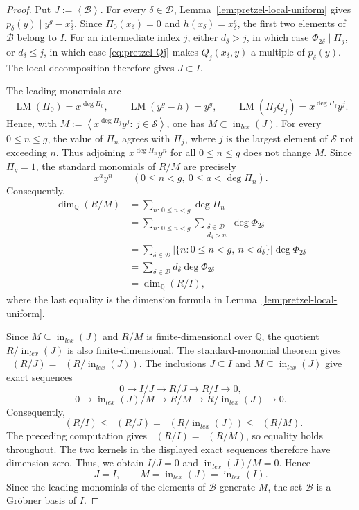\documentclass{article}
\theoremstyle{definition}
\theoremstyle{plain}
\def\dim{\mathop{\mathrm{dim}}\nolimits}
\newcommand{\Q}{{\mathbb{Q}}}
\newcommand{\lex}{lex}
\newcommand{\ideal}[1]{\left\langle #1 \right\rangle}
\DeclareMathOperator{\dimQ}{dim_{\Q}}
\DeclareMathOperator{\inop}{in}
\newcommand{\LM}{\operatorname{LM}}
\begin{document}
\begin{proof}
Put \(J:=\ideal{\mathcal B}\).  For every
\(\delta\in\mathcal D\),
Lemma~\ref{lem:pretzel-local-uniform} gives
\(p_\delta(y)\mid y^g-x_\delta^e\).
Since \(\Pi_0(x_\delta)=0\) and \(h(x_\delta)=x_\delta^e\), the first two
elements of \(\mathcal B\) belong to \(I\).  For an intermediate index
\(j\), either \(d_\delta>j\), in which case
\(\Phi_{2\delta}\mid\Pi_j\), or \(d_\delta\le j\), in which case
\eqref{eq:pretzel-Qj} makes \(Q_j(x_\delta,y)\) a multiple of
\(p_\delta(y)\).  The local decomposition therefore gives
\(J\subset I\).

The leading monomials are
\[
\LM(\Pi_0)=x^{\deg\Pi_0},
\qquad
\LM(y^g-h)=y^g,
\qquad
\LM(\Pi_j Q_j)=x^{\deg\Pi_j}y^j.
\]
Hence, with \(M:=\ideal{x^{\deg\Pi_j}y^j:\,j\in\mathcal S}\), one has
\(M\subset\inop_{\lex}(J)\).  For every
\(0\le n\le g\), the value of \(\Pi_n\) agrees with \(\Pi_j\), where
\(j\) is the largest element of \(\mathcal S\) not exceeding \(n\).
Thus adjoining \(x^{\deg\Pi_n}y^n\) for all \(0\le n\le g\) does not
change \(M\).  Since \(\Pi_g=1\), the standard monomials of \(R/M\) are
precisely
\[
x^a y^n
\qquad
(0\le n<g,\ 0\le a<\deg\Pi_n).
\]
Consequently,
\[
\begin{aligned}
\dim_{\mathbb Q}(R/M)
&=\sum_{n:\,0\le n<g}\deg\Pi_n \\
&=\sum_{n:\,0\le n<g}
\sum_{\substack{\delta\in\mathcal D\\ d_\delta>n}}
\deg\Phi_{2\delta} \\
&=\sum_{\delta\in\mathcal D}
\bigl|\{n:0\le n<g,\ n<d_\delta\}\bigr|
\deg\Phi_{2\delta} \\
&=\sum_{\delta\in\mathcal D}
d_\delta\deg\Phi_{2\delta} \\
&=\dim_{\mathbb Q}(R/I),
\end{aligned}
\]
where the last equality is the dimension formula in
Lemma~\ref{lem:pretzel-local-uniform}.


Since \(M\subseteq\inop_{\lex}(J)\) and
\(R/M\) is finite-dimensional over \(\mathbb Q\),
the quotient \(R/\inop_{\lex}(J)\) is also
finite-dimensional.  The standard-monomial theorem gives
\(\dimQ(R/J)=\dimQ(R/\inop_{\lex}(J))\).
The inclusions \(J\subseteq I\) and
\(M\subseteq\inop_{\lex}(J)\) give exact sequences
\[
0\longrightarrow I/J
\longrightarrow R/J
\longrightarrow R/I
\longrightarrow 0, 
\]
\[
0\longrightarrow \inop_{\lex}(J)/M
\longrightarrow R/M
\longrightarrow R/\inop_{\lex}(J)
\longrightarrow 0.
\]
Consequently,
\[
\dimQ(R/I)
\le
\dimQ(R/J)
=
\dimQ(R/\inop_{\lex}(J))
\le
\dimQ(R/M).
\]
The preceding computation gives
\(\dimQ(R/I)=\dimQ(R/M)\), so equality holds throughout.  The two kernels in the
displayed exact sequences therefore have dimension zero.
Thus, we obtain \(I/J=0\) and \(\inop_{\lex}(J)/M=0\). Hence
\[
J=I,
\qquad
M=\inop_{\lex}(J)=\inop_{\lex}(I).
\]
Since the leading monomials of the elements of
\(\mathcal B\) generate \(M\), the set \(\mathcal B\) is a
Gr\"obner basis of \(I\).
\end{proof}
\end{document}
